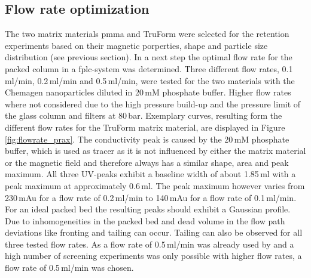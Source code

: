 % 
% 
% 


\subsection{Flow rate optimization}
\label{subsec:flow_rate_res}

The two matrix materials \gls{pmma} and TruForm were selected for the retention experiments based on their magnetic porperties, shape and particle size distribution (see previous section). In a next step the optimal flow rate for the packed column in a \gls{fplc}-system was determined. Three different flow rates, 0.1\,ml/min, 0.2\,ml/min and 0.5\,ml/min, were tested for the two materials with the Chemagen nanoparticles diluted in 20\,mM phosphate buffer. Higher flow rates where not considered due to the high pressure build-up and the pressure limit of the glass column and filters at 80\,bar. Exemplary curves, resulting form the different flow rates for the TruForm matrix material, are displayed in Figure \ref{fig:flowrate_prax}. The conductivity peak is caused by the 20\,mM phosphate buffer, which is used as tracer as it is not influenced by either the matrix material or the magnetic field and therefore always has a similar shape, area and peak maximum. All three UV-peaks exhibit a baseline width of about 1.85\,ml with a peak maximum at approximately 0.6\,ml. The peak maximum however varies from 230\,mAu for a flow rate of 0.2\,ml/min to 140\,mAu for a flow rate of 0.1\,ml/min. 
For an ideal packed bed the resulting peaks should exhibit a Gaussian profile. Due to inhomogeneities in the packed bed and dead volume in the flow path deviations like fronting and tailing can occur. Tailing can also be observed for all three tested flow rates. As a flow rate of 0.5\,ml/min was already used by \cite{AndreMaster} and a high number of screening experiments was only possible with higher flow rates, a flow rate of 0.5\,ml/min was chosen.         

